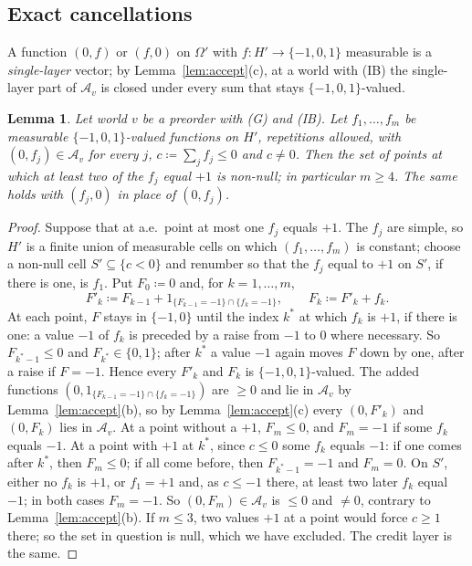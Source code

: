\documentclass[11pt]{article}
\newtheorem{lemma}[theorem]{Lemma}
\theoremstyle{definition}\newtheorem{definition}[theorem]{Definition}
\theoremstyle{remark}\newtheorem{remark}[theorem]{Remark}
\begin{document}
\subsection{Exact cancellations}\label{sec:exact}

A function $(0,f)$ or $(f,0)$ on $\Omega'$ with $f\colon H'\to\{-1,0,1\}$
measurable is a \emph{single-layer} vector; by
Lemma~\ref{lem:accept}(c), at a world with (IB) the single-layer part of
$\mathcal A_v$ is closed under every sum that stays $\{-1,0,1\}$-valued.

\begin{lemma}\label{lem:smallcanc}
Let world $v$ be a preorder with (G) and (IB). Let $f_1,\dots,f_m$ be
measurable $\{-1,0,1\}$-valued functions on $H'$, repetitions allowed, with
$(0,f_j)\in\mathcal A_v$ for every $j$, $c\coloneqq\sum_jf_j\le0$ and
$c\ne0$. Then the set of points at which at least two of the $f_j$ equal
$+1$ is non-null; in particular $m\ge4$. The same holds with $(f_j,0)$ in
place of $(0,f_j)$.
\end{lemma}
\begin{proof}
Suppose that at a.e.\ point at most one $f_j$ equals $+1$. The $f_j$ are
simple, so $H'$ is a finite union of measurable cells on which
$(f_1,\dots,f_m)$ is constant; choose a non-null cell $S'\subseteq\{c<0\}$
and renumber so that the $f_j$ equal to $+1$ on $S'$, if there is one, is
$f_1$. Put $F_0\coloneqq0$ and, for $k=1,\dots,m$,
\[
 F'_k\coloneqq F_{k-1}+1_{\{F_{k-1}=-1\}\cap\{f_k=-1\}},\qquad
 F_k\coloneqq F'_k+f_k.
\]
At each point, $F$ stays in $\{-1,0\}$ until the index $k^*$ at which $f_k$
is $+1$, if there is one: a value $-1$ of $f_k$ is preceded by a raise from
$-1$ to $0$ where necessary. So $F_{k^*-1}\le0$ and $F_{k^*}\in\{0,1\}$; after
$k^*$ a value $-1$ again moves $F$ down by one, after a raise if $F=-1$.
Hence every $F'_k$ and $F_k$ is $\{-1,0,1\}$-valued. The added functions
$(0,1_{\{F_{k-1}=-1\}\cap\{f_k=-1\}})$ are $\ge0$ and lie in $\mathcal A_v$
by Lemma~\ref{lem:accept}(b), so by Lemma~\ref{lem:accept}(c) every
$(0,F'_k)$ and $(0,F_k)$ lies in $\mathcal A_v$. At a point without a $+1$,
$F_m\le0$, and $F_m=-1$ if some $f_k$ equals $-1$. At a point with $+1$ at
$k^*$, since $c\le0$ some $f_k$ equals $-1$: if one comes after $k^*$, then
$F_m\le0$; if all come before, then $F_{k^*-1}=-1$ and $F_m=0$. On $S'$,
either no $f_k$ is $+1$, or $f_1=+1$ and, as $c\le-1$ there, at least two
later $f_k$ equal $-1$; in both cases $F_m=-1$. So $(0,F_m)\in\mathcal A_v$
is $\le0$ and $\ne0$, contrary to Lemma~\ref{lem:accept}(b). If $m\le3$, two
values $+1$ at a point would force $c\ge1$ there; so the set in question is
null, which we have excluded. The credit layer is the same.
\end{proof}
\end{document}
